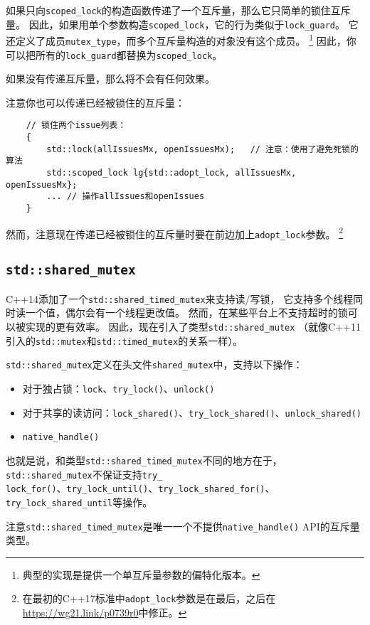 如果只向\texttt{scoped\_lock}的构造函数传递了一个互斥量，那么它只简单的锁住互斥量。
因此，如果用单个参数构造\texttt{scoped\_lock}，它的行为类似于\texttt{lock\_guard}。
它还定义了成员\texttt{mutex\_type}，而多个互斥量构造的对象没有这个成员。
\footnote{典型的实现是提供一个单互斥量参数的偏特化版本。}
因此，你可以把所有的\texttt{lock\_guard}都替换为\texttt{scoped\_lock}。

如果没有传递互斥量，那么将不会有任何效果。

注意你也可以传递已经被锁住的互斥量：
\begin{lstlisting}
    // 锁住两个issue列表：
    {
        std::lock(allIssuesMx, openIssuesMx);   // 注意：使用了避免死锁的算法
        std::scoped_lock lg{std::adopt_lock, allIssuesMx, openIssuesMx};
        ... // 操作allIssues和openIssues
    }
\end{lstlisting}
然而，注意现在传递已经被锁住的互斥量时要在前边加上\texttt{adopt\_lock}参数。
\footnote{在最初的C++17标准中\texttt{adopt\_lock}参数是在最后，之后在
\url{https://wg21.link/p0739r0}中修正。}

\subsection{\texttt{std::shared\_mutex}}
C++14添加了一个\texttt{std::shared\_timed\_mutex}来支持读/写锁，
它支持多个线程同时读一个值，偶尔会有一个线程更改值。
然而，在某些平台上不支持超时的锁可以被实现的更有效率。
因此，现在引入了类型\texttt{std::shared\_mutex}
（就像C++11引入的\texttt{std::mutex}和\texttt{std::timed\_mutex}的关系一样）。

\texttt{std::shared\_mutex}定义在头文件\texttt{shared\_mutex}中，支持以下操作：
\begin{itemize}
    \item 对于独占锁：\texttt{lock}、\texttt{try\_lock()}、\texttt{unlock()}
    \item 对于共享的读访问：\texttt{lock\_shared()}、\texttt{try\_lock\_shared()}、\texttt{unlock\_shared()}
    \item \texttt{native\_handle()}
\end{itemize}
也就是说，和类型\texttt{std::shared\_timed\_mutex}不同的地方在于，
\texttt{std::shared\_mutex}不保证支持\texttt{try\_\\
lock\_for()}、\texttt{try\_lock\_until()}、\texttt{try\_lock\_shared\_for()}、\texttt{try\_lock\_shared\_until}等操作。

注意\texttt{std::shared\_timed\_mutex}是唯一一个不提供\texttt{native\_handle()} API的互斥量类型。


